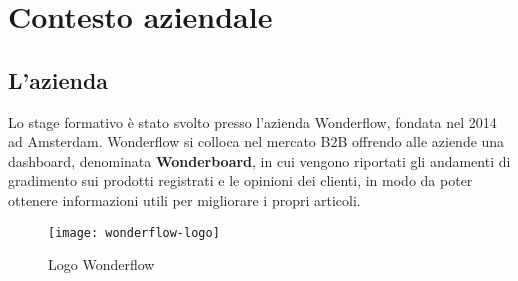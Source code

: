 \mainmatter
\chapter{Contesto aziendale}
\label{cap:contesto-aziendale}

\section{L'azienda}
Lo stage formativo è stato svolto presso l'azienda Wonderflow, fondata nel 2014
ad Amsterdam. Wonderflow si colloca nel mercato \gls{B2B} offrendo alle aziende 
una \gls{dashboard}, denominata \textbf{Wonderboard}, in cui vengono riportati 
gli andamenti di gradimento sui prodotti registrati e le opinioni dei clienti, 
in modo da poter ottenere informazioni utili per migliorare i propri articoli.

\begin{figure}[htbp]
\begin{center}
\texttt{[image: wonderflow-logo]}
\caption{Logo Wonderflow}
\end{center}
\end{figure}





